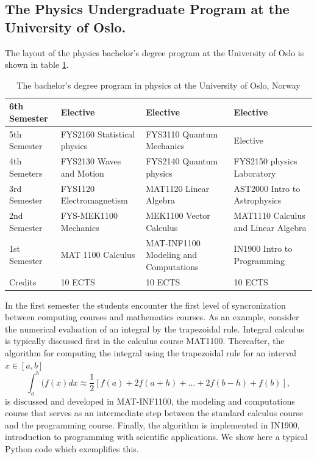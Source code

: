 \documentclass[graybox,envcountchap,sectrefs]{svmult}
\begin{document}
\subsection{The Physics Undergraduate Program at the University of Oslo.}
The layout of the physics bachelor's degree program at the University of Oslo is shown in table \ref{tab:FAUiO}.
\begin{table}
\caption{The bachelor's degree program in physics at the University of Oslo, Norway}\label{tab:FAUiO}
\begin{footnotesize}
\begin{tabular}{|l|l|l|l|}
\hline
\multicolumn{1}{|l}{ 6th Semester } & \multicolumn{1}{|l|}{ Elective } & \multicolumn{1}{|l|}{ Elective } & \multicolumn{1}{|l|}{ Elective } \\
\hline
5th Semester & FYS2160 Statistical physics & FYS3110 Quantum Mechanics             & Elective                                                        \\
\hline
4th Semeters & FYS2130 Waves and Motion    & FYS2140 Quantum physics               & FYS2150 physics Laboratory                                      \\
\hline
3rd Semester & FYS1120 Electromagnetism    & MAT1120 Linear Algebra                & AST2000 Intro to Astrophysics                            \\
\hline
2nd Semester & FYS-MEK1100 Mechanics       & MEK1100 Vector Calculus               & MAT1110 Calculus and Linear Algebra                             \\
\hline
1st Semester & MAT 1100 Calculus           & MAT-INF1100 Modeling and Computations & IN1900 Intro to Programming \\
\hline
Credits      & 10 ECTS                     & 10 ECTS                               & 10 ECTS                                                         \\
\hline
\end{tabular}
\end{footnotesize}
\end{table}


In the first semester the students encounter the first level of syncronization between computing courses  and mathematics courses.
As an example, consider the numerical evaluation of an integral by  the trapezoidal rule. Integral calculus is typically discussed first in the calculus course MAT1100.
Thereafter, the algorithm for computing  the  integral using the trapezoidal rule for an interval $x \in [a,b]$
\[
  \int_a^b(f(x) dx \approx \frac{1}{2}\left [f(a)+2f(a+h)+\dots+2f(b-h)+f(b)\right],
\]
is discussed and developed in MAT-INF1100, the modeling and
computations course that serves as an intermediate step between the
standard calculus course and the programming course. Finally, the
algorithm is implemented in IN1900, introduction to programming with
scientific applications.  We show here a typical Python code which
exemplifies this.
\end{document}
